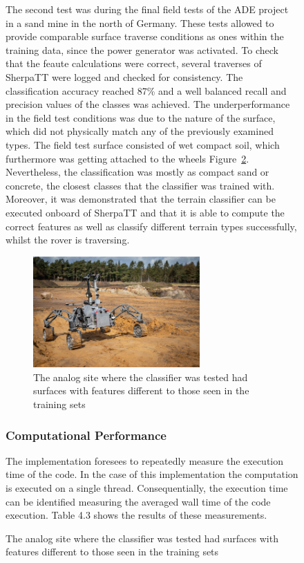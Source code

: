 \documentclass{article}
\begin{document}
\begin{figure}[!htb]
The second test was during the final field tests of the ADE project \cite{ocon2021} in a sand mine in the north of Germany.
These tests allowed to provide comparable surface traverse conditions as ones within the training data, since the power generator was activated.
To check that the feaute calculations were correct, several traverses of SherpaTT were logged and checked for consistency. 
The classification accuracy reached 87\% and a well balanced recall and precision values of the classes was achieved. 
The underperformance in the field test conditions was due to the nature of the surface, which did not physically match any of the previously examined types. 
The field test surface consisted of wet compact soil, which furthermore was getting attached to the wheels Figure~\ref{fig:finaltest}.
Nevertheless, the classification was mostly as compact sand or concrete, the closest classes that the classifier was trained with.
Moreover, it was demonstrated that the terrain classifier can be executed onboard of SherpaTT and that it is able to compute the correct features as well as classify different terrain types successfully, whilst the rover is traversing.


\begin{figure}[!htb]
 \centering
 \includegraphics[width=0.7\textwidth]{../figures/sandmine.png}
 \caption{The analog site where the classifier was tested had surfaces with features different to those seen in the training sets}
 \label{fig:finaltest}
\end{figure}


\subsubsection{Computational Performance}


The implementation foresees to repeatedly measure the execution time of the code. In the case of this implementation the computation is executed on a single thread. Consequentially, the execution time can be identified measuring the averaged wall time of the code execution. Table 4.3 shows the results of these measurements. 


\end{figure}
\end{document}
